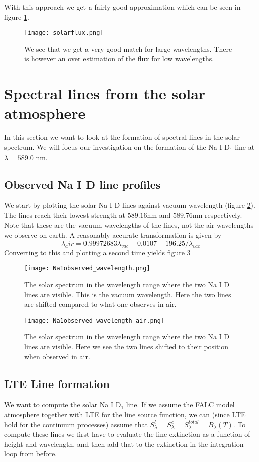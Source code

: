 \documentclass{aa}   %
\begin{document}
With this approach we get a fairly good approximation which can be seen in figure \ref{solarflux}.
\begin{figure}
 \texttt{[image: solarflux.png]}
 \caption{We see that we get a very good match for large wavelengths. There is however an over estimation of the flux for low wavelengths. }
\label{solarflux}
\end{figure}

\section{Spectral lines from the solar atmosphere}
In this section we want to look at the formation of spectral lines in the solar spectrum. We will focus our investigation on the formation of the Na I D$_1$ line at $\lambda = 589.0$ nm. 

\subsection{Observed Na I D line profiles}
We start by plotting the solar Na I D lines against vacuum wavelength (figure \ref{Na1observed_wavelength}).
The lines reach their lowest strength at $589.16$nm and $589.76$nm respectively. Note that these are the vacuum wavelengths of the lines, not the air wavelengths we observe on earth. A reasonably accurate transformation is given by
\begin{equation}
 \lambda_air = 0.99972683\lambda_{vac} + 0.0107 - 196.25/\lambda_{vac}
\end{equation}
Converting to this and plotting a second time yields figure \ref{Na1observed_wavelength_air}
\begin{figure}
 \texttt{[image: Na1observed\_wavelength.png]}
 \caption{The solar spectrum in the wavelength range where the two Na I D lines are visible. This is the vacuum wavelength. Here the two lines are shifted compared to what one observes in air.}
\label{Na1observed_wavelength}
\end{figure}
\begin{figure}
 \texttt{[image: Na1observed\_wavelength\_air.png]}
 \caption{The solar spectrum in the wavelength range where the two Na I D lines are visible. Here we see the two lines shifted to their position when observed in air.}
\label{Na1observed_wavelength_air}
\end{figure}

\subsection{LTE Line formation}
We want to compute the solar Na I D$_1$ line. If we assume the FALC model atmosphere together with LTE for the line source function, we can (since LTE hold for the continuum processes) assume that $S_\lambda^l = S_\lambda^c = S_\lambda^{total} = B_\lambda(T)$. To compute these lines we first have to evaluate the line extinction as a function of height and wavelength, and then add that to the extinction in the integration loop from before.
\end{document}

